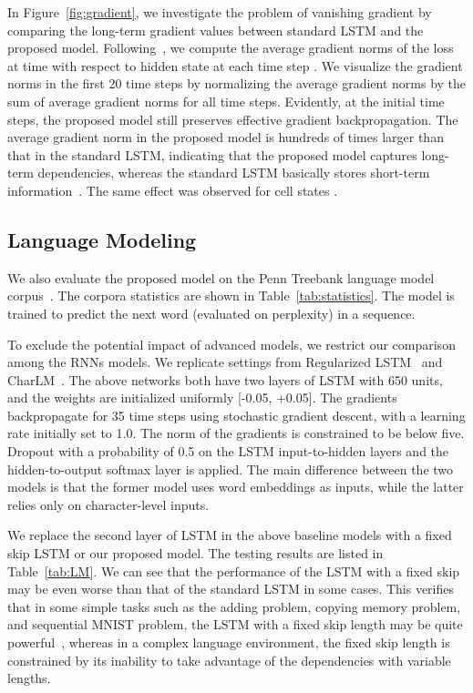 \documentclass[letterpaper]{article} \usepackage{aaai19}  \usepackage{times}  \usepackage{helvet}  \usepackage{courier}  \usepackage{url}  \usepackage{graphicx}  \usepackage{amsmath}
\begin{document}
In Figure~\ref{fig:gradient}, we investigate the problem of vanishing gradient by comparing the long-term gradient values between standard LSTM and the proposed model. Following~\cite{mujika2017fast}, we compute the average gradient norms  of the loss at time  with respect to hidden state  at each time step . We visualize the gradient norms in the first 20 time steps by normalizing the average gradient norms by the sum of average gradient norms for all time steps. Evidently, at the initial time steps, the proposed model still preserves effective gradient backpropagation. The average gradient norm in the proposed model is hundreds of times larger than that in the standard LSTM, indicating that the proposed model captures long-term dependencies, whereas the standard LSTM basically stores short-term information~\cite{mujika2017fast}. The same effect was observed for cell states .



\subsection{Language Modeling}
We also evaluate the proposed model on the Penn Treebank language model corpus~\cite{marcus1993building}. The corpora statistics are shown in Table~\ref{tab:statistics}. The model is trained to predict the next word (evaluated on perplexity) in a sequence.

To exclude the potential impact of advanced models, we restrict our comparison among the RNNs models. We replicate settings from Regularized LSTM~\cite{zaremba2014recurrent} and CharLM~\cite{kim2016character}. The above networks both have two layers of LSTM with 650 units, and the weights are initialized uniformly [-0.05, +0.05]. The gradients backpropagate for 35 time steps using stochastic gradient descent, with a learning rate initially set to 1.0. The norm of the gradients is constrained to be below five. Dropout with a probability of 0.5 on the LSTM input-to-hidden layers and the hidden-to-output softmax layer is applied. The main difference between the two models is that the former model uses word embeddings as inputs, while the latter relies only on character-level inputs.

We replace the second layer of LSTM in the above baseline models with a fixed skip LSTM or our proposed model. The testing results are listed in Table~\ref{tab:LM}. We can see that the performance of the LSTM with a fixed skip may be even worse than that of the standard LSTM in some cases. This verifies that in some simple tasks such as the adding problem, copying memory problem, and sequential MNIST problem, the LSTM with a fixed skip length may be quite powerful~\cite{zhang2016architectural}, whereas in a complex language environment, the fixed skip length is constrained by its inability to take advantage of the dependencies with variable lengths.
\end{document}

